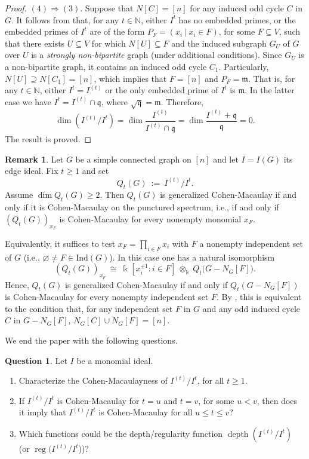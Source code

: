 \documentclass[12pt]{amsart}
\numberwithin{equation}{section}
\theoremstyle{definition}
\newtheorem{quest}[theorem]{Question}
\theoremstyle{definition}
\newtheorem{remark}[theorem]{Remark}
\DeclareMathOperator{\depth}{depth}
\DeclareMathOperator{\reg}{reg}
\newcommand{\NN}{{\mathbb N}}
\def\kk{{\Bbbk}}
\def\mm{{\mathfrak m}}
\def\qq{{\mathfrak q}}
\begin{document}
\begin{proof}
$(4) \Longrightarrow (3)$. Suppose that $N[C] = [n]$ for any induced odd cycle $C$ in $G$. It follows from \cite[Theorem 4.4]{LT2019} that, for any $t \in \NN$, either $I^t$ has no embedded primes, or the embedded primes of $I^t$ are of the form $P_F = (x_i ~\big|~ x_i \in F)$, for some $F \subseteq V$, such that there exists $U \subseteq V$ for which $N[U] \subseteq F$ and the induced subgraph $G_U$ of $G$ over $U$ is a \emph{strongly non-bipartite} graph (under additional conditions). Since $G_U$ is a non-bipartite graph, it contains an induced odd cycle $C_1$. Particularly, $N[U] \supseteq N[C_1] = [n]$, which implies that $F = [n]$ and $P_F = \mm$. That is, for any $t \in \NN$, either $I^t = I^{(t)}$ or the only embedded prime of $I^t$ is $\mm$. 
In the latter case we have $I^t = I^{(t)} \cap \qq$, where $\sqrt{\qq} = \mm$. Therefore,
$$\dim (I^{(t)}/I^t) = \dim \dfrac{I^{(t)}}{I^{(t)} \cap \qq} = \dim \dfrac{I^{(t)} + \qq}{\qq}  = 0.$$
The result is proved.
\end{proof}

\begin{remark}\label{rmk:gCMQt}
	Let $G$ be a simple connected graph on $[n]$ and let $I=I(G)$ its edge ideal. Fix $t\ge1$ and set
	\[
	Q_t(G)\ :=\ I^{(t)}/I^t.
	\]
	Assume $\dim Q_t(G)\ge2$. Then $Q_t(G)$ is generalized Cohen-Macaulay if and only if it is Cohen-Macaulay on the punctured spectrum, i.e., if and only if $(Q_t(G))_{x_F}$ is Cohen-Macaulay for every nonempty monomial $x_F$.
	
	Equivalently, it suffices to test $x_F=\prod_{i\in F}x_i$ with $F$ a nonempty independent set of $G$ (i.e., $\varnothing \not= F\in \text{Ind}(G)$). In this case one has a natural isomorphism
	\[
	(Q_t(G))_{x_F}\ \cong\ \kk[x_i^{\pm1}:i\in F]\ \otimes_\kk\ Q_t\bigl(G-N_G[F]\bigr).
	\]
	Hence, $Q_t(G)$ is generalized Cohen-Macaulay if and only if $Q_t(G-N_G[F])$ is Cohen-Macaulay for every nonempty independent set $F$. By , this is equivalent to the condition that, for any independent set $F$ in $G$ and any odd induced cycle $C$ in $G - N_G[F]$, $N_G[C] \cup N_G[F] = [n]$.
\end{remark}

We end the paper with the following questions.

\begin{quest} Let $I$ be a monomial ideal.
	\begin{enumerate}
		\item Characterize the Cohen-Macaulayness of $I^{(t)}/I^t$, for all $t \ge 1$.
		\item If $I^{(t)}/I^t$ is Cohen-Macaulay for $t = u$ and $t = v$, for some $u < v$, then does it imply that $I^{(t)}/I^t$ is Cohen-Macaulay for all $u \le t \le v$?
		\item Which functions could be the depth/regularity function $\depth (I^{(t)}/I^t)$ (or $\reg (I^{(t)}/I^t$))?
	\end{enumerate} 
\end{quest}
\end{document}

